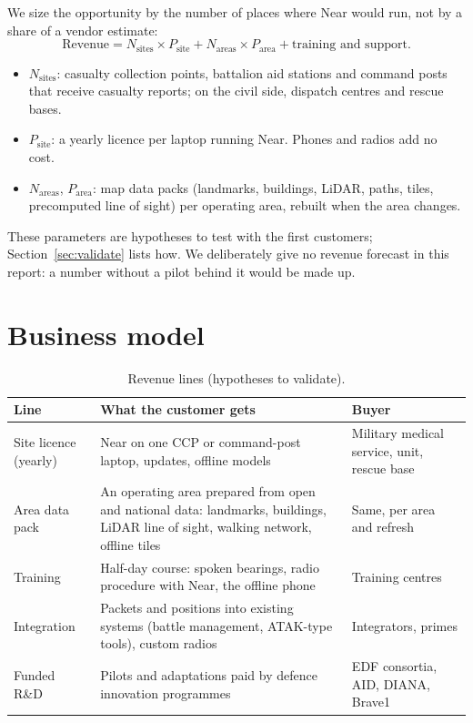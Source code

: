 We size the opportunity by the number of places where Near would run, not by a share of a vendor estimate:
\begin{equation}
  \text{Revenue} = N_{\text{sites}} \times P_{\text{site}} + N_{\text{areas}} \times P_{\text{area}} + \text{training and support}.
\end{equation}
\begin{itemize}
  \item $N_{\text{sites}}$: casualty collection points, battalion aid stations and command posts that receive casualty reports;
        on the civil side, dispatch centres and rescue bases.
  \item $P_{\text{site}}$: a yearly licence per laptop running Near. Phones and radios add no cost.
  \item $N_{\text{areas}}$, $P_{\text{area}}$: map data packs (landmarks, buildings, LiDAR, paths, tiles, precomputed line of
        sight) per operating area, rebuilt when the area changes.
\end{itemize}
These parameters are hypotheses to test with the first customers; Section~\ref{sec:validate} lists how. We deliberately
give no revenue forecast in this report: a number without a pilot behind it would be made up.

\section{Business model}

\begin{table}[htbp]\centering\small
\caption{Revenue lines (hypotheses to validate).}\label{tab:revenue}
\begin{tabularx}{\linewidth}{>{\raggedright}p{3.6cm}X>{\raggedright\arraybackslash}p{3.6cm}}
\toprule
Line & What the customer gets & Buyer\\
\midrule
Site licence (yearly) & Near on one CCP or command-post laptop, updates, offline models & Military medical service, unit, rescue base\\
Area data pack & An operating area prepared from open and national data: landmarks, buildings, LiDAR line of sight, walking network, offline tiles & Same, per area and refresh\\
Training & Half-day course: spoken bearings, radio procedure with Near, the offline phone & Training centres\\
Integration & Packets and positions into existing systems (battle management, ATAK-type tools), custom radios & Integrators, primes\\
Funded R\&D & Pilots and adaptations paid by defence innovation programmes & EDF consortia, AID, DIANA, Brave1\\
\bottomrule
\end{tabularx}
\end{table}

